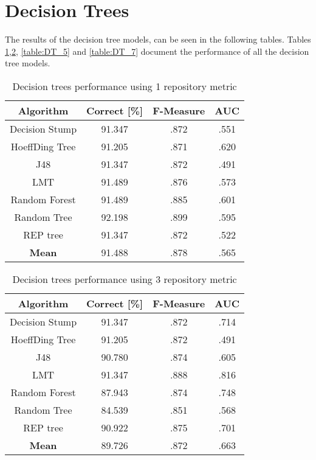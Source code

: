 \section{Decision Trees}
The results of the decision tree models, can be seen in the following tables. Tables \ref{table:DT_1},\ref{table:DT_3}, \ref{table:DT_5} and \ref{table:DT_7} document the performance of all the decision tree models.
\begin{table}[h!]
\centering
\begin{tabular}{ |c|c|c|c| }
 \hline
 \textbf{Algorithm} & \textbf{Correct [\%]} & \textbf{F-Measure} & \textbf{AUC}  \\
 \hline
 Decision Stump & 91.347 & .872 & .551    \\
 \hline
 HoeffDing Tree &  91.205 & .871 & .620   \\
 \hline
  J48 & 91.347 & .872 & .491\\
 \hline
  LMT & 91.489 & .876 & .573  \\
 \hline
  Random Forest & 91.489 & .885 & .601 \\
 \hline
  Random Tree & 92.198 & .899 & .595 \\
 \hline
 REP tree  & 91.347 & .872 & .522 \\
 \hline
 \textbf{Mean}  & 91.488 & .878 & .565 \\
 \hline
\end{tabular}
\caption{Decision trees performance using 1 repository metric}
\label{table:DT_1}
\end{table}

\begin{table}[h!]
\centering
\begin{tabular}{ |c|c|c|c| }
 \hline
 \textbf{Algorithm} & \textbf{Correct [\%]} & \textbf{F-Measure} & \textbf{AUC}  \\
 \hline
 Decision Stump & 91.347 & .872 & .714    \\
 \hline
 HoeffDing Tree &  91.205 & .872 & .491   \\
 \hline
  J48 & 90.780 & .874 & .605\\
 \hline
  LMT & 91.347 & .888 & .816  \\
 \hline
  Random Forest & 87.943 & .874 & .748 \\
 \hline
  Random Tree & 84.539 & .851 & .568 \\
 \hline
 REP tree  & 90.922 & .875 & .701 \\
 \hline
 \textbf{Mean}  & 89.726 & .872 & .663 \\
 \hline

\end{tabular}
\caption{Decision trees performance using 3 repository metric}
\label{table:DT_3}
\end{table}

